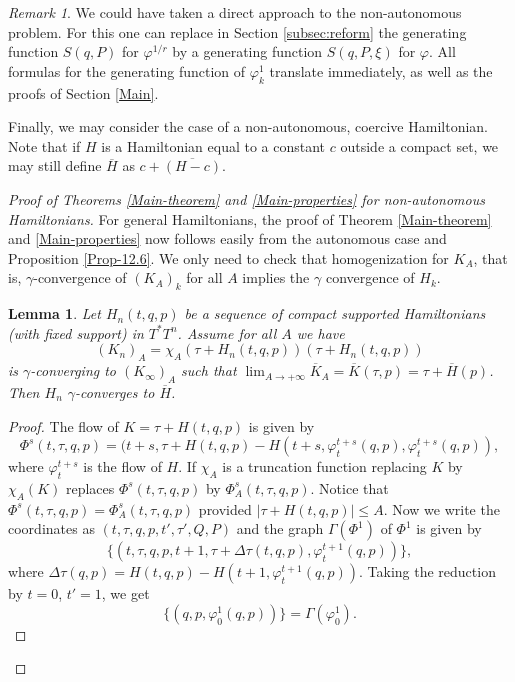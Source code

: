 \documentclass[JEP,XML,SOM,NoFloatCountersInSection,Unicode,published]{cedram}
\numberwithin{equation}{section}
\theoremstyle{plain}
\newtheorem{lemma}[theorem]{Lemma}
\theoremstyle{definition}
\theoremstyle{remark}
\newtheorem{remark}[theorem]{Remark}
\begin{document}
\begin{remark}
We could have taken a direct approach to the non-autonomous problem. For this one can replace in Section \ref{subsec:reform} the generating function $S(q,P)$ for $\varphi^{1/r}$ by a generating function $S(q,P,\xi)$ for $\varphi$. All formulas for the generating function of $\varphi_{k}^{1}$ translate immediately, as well as the proofs of Section \ref{Main}.
\end{remark}
Finally, we may consider the case of a non-autonomous, coercive Hamiltonian. Note that if $H$ is a Hamiltonian equal to a constant $c$ outside a compact set, we may still define $\overline H$ as $c+\overline {(H-c)}$.

\begin{proof} [Proof of Theorems \ref{Main-theorem} and \ref{Main-properties} for non-autonomous Hamiltonians]\mbox{}\hspace*{-2mm}
For general Hamiltonians, the proof of Theorem \ref{Main-theorem} and \ref{Main-properties} now follows easily from the autonomous case and Proposition \ref{Prop-12.6}.
We only need to check that homogenization for $K_A$, that is, $\gamma$-convergence of $(K_A)_k$ for all $A$ implies the $\gamma$ convergence of $H_k$.
\begin{lemma}
Let $H_n(t,q,p)$ be a sequence of compact supported Hamiltonians (with fixed support) in $T^*T^n$. Assume for all $A$ we have\vspace*{-3pt}
\[
(K_n)_A=\chi_{A}(\tau+H_n(t,q,p)) (\tau+H_n(t,q,p))
\]
is $\gamma$-converging to $(K_\infty)_A$ such that
$\lim_{A\to +\infty }\overline K_{A}=\overline K(\tau,p)=\tau+\overline H(p)$. Then $H_n$ $\gamma$-converges to $\overline H$.
\end{lemma}
\begin{proof}
The flow of $K=\tau+H(t,q,p)$ is given by\vspace*{-3pt}
\[
\Phi^s(t,\tau, q,p)=(t+s, \tau+H(t,q,p)-H(t+s,\varphi_t^{t+s}(q,p), \varphi_t^{t+s}(q,p)),
\]
where $\varphi_t^{t+s}$ is the flow of $H$. If $\chi_A$ is a truncation function replacing $K$ by $\chi_A(K)$ replaces $\Phi^s(t,\tau,q,p)$ by
$\Phi_A^s(t,\tau,q,p)$. Notice that $\Phi^s(t,\tau,q,p)=\Phi_A^s(t,\tau,q,p)$ provided $ \vert \tau+H(t,q,p) \vert \leq A$. Now we write the coordinates as $(t,\tau,q,p,t',\tau',Q,P)$ and the graph $\Gamma(\Phi^1)$ of
$\Phi^1$ is given by
\[
\{ (t,\tau,q,p, t+1,\tau + \Delta\tau(t,q,p),\varphi_t^{t+1}(q,p))\},
\]
where $\Delta\tau(q,p)=H(t,q,p)-H(t+1, \varphi_t^{t+1}(q,p))$. Taking the reduction by $t=0$, $t'=1$, we get\vspace*{-4pt}\enlargethispage{.5\baselineskip}
\[
\{ (q,p,\varphi_0^{1}(q,p))\}= \Gamma (\varphi_0^1).
\]


\end{proof}
\end{proof}
\end{document}
